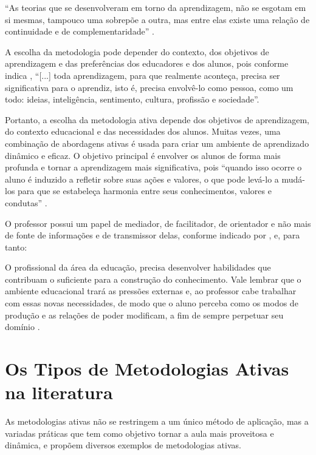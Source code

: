 ``As teorias que se desenvolveram em torno da aprendizagem, não se esgotam em si mesmas, tampouco uma sobrepõe a outra, mas entre elas existe uma relação de continuidade e de complementaridade'' \cite[p. 5]{LACERDA2023}.

A escolha da metodologia pode depender do contexto, dos objetivos de aprendizagem e das preferências dos educadores e dos alunos, pois conforme indica , ``[...] toda aprendizagem, para que realmente aconteça, precisa ser significativa para o aprendiz, isto é, precisa envolvê-lo como pessoa, como um todo: ideias, inteligência, sentimento, cultura, profissão e sociedade''.

Portanto, a escolha da metodologia ativa depende dos objetivos de aprendizagem, do contexto educacional e das necessidades dos alunos. Muitas vezes, uma combinação de abordagens ativas é usada para criar um ambiente de aprendizado dinâmico e eficaz. O objetivo principal é envolver os alunos de forma mais profunda e tornar a aprendizagem mais significativa, pois ``quando isso ocorre o aluno é induzido a refletir sobre suas ações e valores, o que pode levá-lo a mudá-los para que se estabeleça harmonia entre seus conhecimentos, valores e condutas'' \cite[p. 315]{FRASSON2019}.

O professor possui um papel de mediador, de facilitador, de orientador e não mais de fonte de informações e de transmissor delas, conforme indicado por 
, e, para tanto:

\begin{citacao}
    O profissional da área da educação, precisa desenvolver habilidades que contribuam o suficiente para a construção do conhecimento. Vale lembrar que o ambiente educacional trará as pressões externas e, ao professor cabe trabalhar com essas novas necessidades, de modo que o aluno perceba como os modos de produção e as relações de poder modificam, a fim de sempre perpetuar seu domínio \cite[p. 4]{NathBragaTeixeira2017}.
\end{citacao}

\section{Os Tipos de Metodologias Ativas na literatura}

As metodologias ativas não se restringem a um único método de aplicação, mas a variadas práticas que tem como objetivo tornar a aula mais proveitosa e dinâmica, e  propõem diversos exemplos de metodologias ativas.

